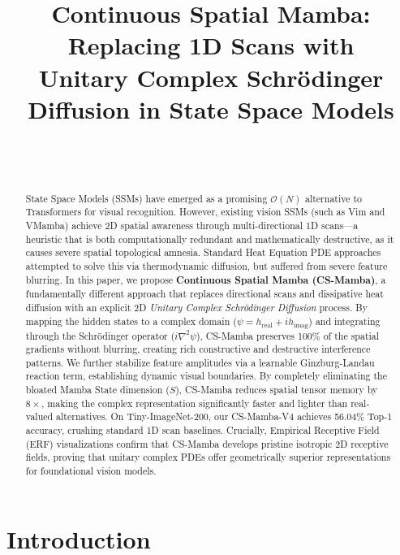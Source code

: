 \documentclass{article}
\title{Continuous Spatial Mamba: Replacing 1D Scans with\\
       Unitary Complex Schrödinger Diffusion in State Space Models}
\author{
  \todo{Author names after review}\\
  \todo{Institution}\\
}
\newcommand{\cs}{CS-Mamba}
\newcommand{\lap}{\nabla^2}
\begin{document}
\maketitle

\begin{abstract}
State Space Models (SSMs) have emerged as a promising $\mathcal{O}(N)$ alternative to
Transformers for visual recognition. However, existing vision SSMs (such as Vim and VMamba) 
achieve 2D spatial awareness through multi-directional 1D scans—a heuristic that
is both computationally redundant and mathematically destructive, as it causes severe 
spatial topological amnesia. Standard Heat Equation PDE approaches attempted to solve 
this via thermodynamic diffusion, but suffered from severe feature blurring. In this 
paper, we propose \textbf{Continuous Spatial Mamba (\cs{})}, a fundamentally different 
approach that replaces directional scans and dissipative heat diffusion with an explicit 
2D \emph{Unitary Complex Schrödinger Diffusion} process. By mapping the hidden states 
to a complex domain ($\psi = h_{\text{real}} + i h_{\text{imag}}$) and integrating 
through the Schrödinger operator ($i \lap \psi$), \cs{} preserves 100\% of the spatial 
gradients without blurring, creating rich constructive and destructive interference 
patterns. We further stabilize feature amplitudes via a learnable Ginzburg-Landau 
reaction term, establishing dynamic visual boundaries. By completely eliminating the 
bloated Mamba State dimension ($S$), \cs{} reduces spatial tensor memory by $8\times$, 
making the complex representation significantly faster and lighter than real-valued 
alternatives. On Tiny-ImageNet-200, our \cs{}-V4 achieves 56.04\% Top-1 
accuracy, crushing standard 1D scan baselines. Crucially, Empirical Receptive Field 
(ERF) visualizations confirm that \cs{} develops pristine isotropic 2D receptive fields, 
proving that unitary complex PDEs offer geometrically superior representations 
for foundational vision models.
\end{abstract}

\section{Introduction}
\end{document}
